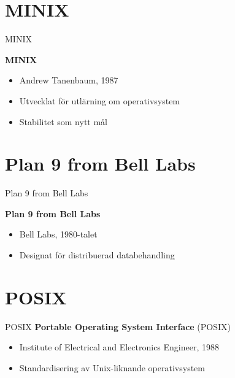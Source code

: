 \documentclass[compress, final]{beamer}
\begin{document}
\section{MINIX}

\begin{frame}{MINIX}
  \begin{minipage}[l]{0.60\textwidth}
    \textbf{MINIX}
    \begin{itemize}
      \item Andrew Tanenbaum, 1987
      \item Utvecklat för utlärning om operativsystem
      \item Stabilitet som nytt mål
    \end{itemize}
  \end{minipage}
  \begin{minipage}[r]{0.35\textwidth}
  \end{minipage}
\end{frame}


\section{Plan 9 from Bell Labs}

\begin{frame}{Plan 9 from Bell Labs}
  \begin{minipage}[l]{0.60\textwidth}
    \textbf{Plan 9 from Bell Labs}
    \begin{itemize}
      \item Bell Labs, 1980-talet
      \item Designat för distribuerad databehandling
    \end{itemize}
  \end{minipage}
  \begin{minipage}[r]{0.35\textwidth}
  \end{minipage}
\end{frame}


\section{POSIX}

\begin{frame}{POSIX}
  \textbf{Portable Operating System Interface} (POSIX)
  \begin{itemize}
    \item Institute of Electrical and Electronics Engineer, 1988
    \item Standardisering av Unix-liknande operativsystem
  \end{itemize}
\end{frame}
\end{document}
